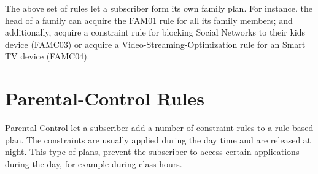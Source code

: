 \begin{table}[H]
\begin{center}
\end{center}
\caption{Family Shared Rules}
\label{FP_initial}
\end{table}

\begin{table}[H]
\begin{center}
\end{center}
\caption{Family Shared Rules - Bolt-ons/Constraints}
\label{FP_constraints}
\end{table}

The above set of rules let a subscriber form its own family plan. For instance, the head of a family can acquire the FAM01 rule for all its family members; and additionally, acquire a constraint rule for blocking Social Networks to their kids device (FAMC03) or acquire a Video-Streaming-Optimization rule for an Smart TV device (FAMC04). 

\section{Parental-Control Rules}
\noindent
Parental-Control let a subscriber add a number of constraint rules to a rule-based plan. The constraints are usually applied during the day time and are released at night. This type of plans, prevent the subscriber to access certain applications during the day, for example during class hours. \\

